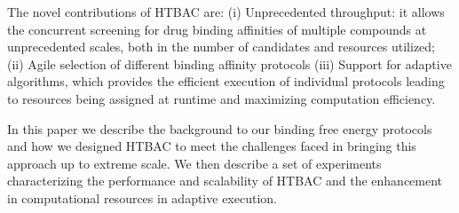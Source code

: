 
The novel contributions of HTBAC are: (i) Unprecedented throughput: it allows
the concurrent screening for drug binding affinities of multiple compounds at
unprecedented scales, both in the number of candidates and resources utilized;
(ii) Agile selection of different binding affinity protocols
(iii) Support for adaptive algorithms, which provides the
efficient execution of individual protocols leading to resources being assigned
at runtime and maximizing computation efficiency. 



In this paper we describe the background to our binding free energy protocols
and how we designed HTBAC to meet the challenges faced in bringing this
approach up to extreme scale. We then describe a set of experiments
characterizing the performance and scalability of HTBAC and the enhancement in 
computational resources in adaptive execution. 

